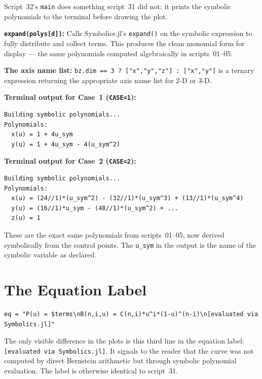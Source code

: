 \documentclass[12pt, a4paper]{article}
\newcommand{\cd}[1]{\texttt{#1}}
\begin{document}
Script~32's \cd{main} does something script~31 did not:
it prints the symbolic polynomials to the terminal
before drawing the plot.

\textbf{\cd{expand(polys[d])}:}
Calls Symbolics.jl's \cd{expand()} on the symbolic
expression to fully distribute and collect terms.
This produces the clean monomial form for display ---
the same polynomials computed algebraically in scripts~01--05.

\textbf{The axis name list:}
\cd{bz.dim == 3 ? ["x","y","z"] : ["x","y"]} is a ternary
expression returning the appropriate axis name list for
2-D or 3-D.

\begin{examplebox}
\textbf{Terminal output for Case~1 (\cd{CASE=1}):}
\begin{verbatim}
Building symbolic polynomials...
Polynomials:
  x(u) = 1 + 4u_sym
  y(u) = 1 + 4u_sym - 4(u_sym^2)
\end{verbatim}

\textbf{Terminal output for Case~2 (\cd{CASE=2}):}
\begin{verbatim}
Building symbolic polynomials...
Polynomials:
  x(u) = (24//1)*(u_sym^2) - (32//1)*(u_sym^3) + (13//1)*(u_sym^4)
  y(u) = (16//1)*u_sym - (48//1)*(u_sym^2) + ...
  z(u) = 1
\end{verbatim}

These are the exact same polynomials from scripts~01--05,
now derived symbolically from the control points.
The \cd{u\_sym} in the output is the name of the
symbolic variable as declared.
\end{examplebox}


\section{The Equation Label}

\begin{verbatim}
eq = "P(u) = $terms\nB(n,i,u) = C(n,i)*u^i*(1-u)^(n-i)\n[evaluated via Symbolics.jl]"
\end{verbatim}

The only visible difference in the plots is this third
line in the equation label: \cd{[evaluated via Symbolics.jl]}.
It signals to the reader that the curve was not computed
by direct Bernstein arithmetic but through symbolic
polynomial evaluation.
The label is otherwise identical to script~31.
\end{document}
